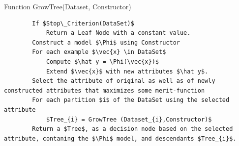 

\lstset{style=customAlg}
\begin{algorithm}
	\caption{Function GrowTree(Dataset, Constructor)}
	\begin{lstlisting}
		If $Stop\_Criterion(DataSet)$
			Return a Leaf Node with a constant value.
		Construct a model $\Phi$ using Constructor
		For each example $\vec{x} \in DataSet$
			Compute $\hat y = \Phi(\vec{x})$
			Extend $\vec{x}$ with new attributes $\hat y$.
		Select the attribute of original as well as of newly constructed attributes that maximizes some merit-function
		For each partition $i$ of the DataSet using the selected attribute
			$Tree_{i} = GrowTree (Dataset_{i},Constructor)$
		Return a $Tree$, as a decision node based on the selected attribute, contaning the $\Phi$ model, and descendants $Tree_{i}$.
	\end{lstlisting}
\end{algorithm}

